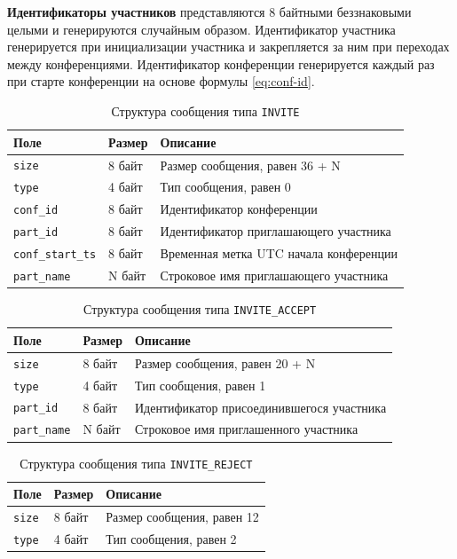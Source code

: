 \textbf{Идентификаторы участников} представляются 8 байтными беззнаковыми целыми и генерируются случайным образом.
Идентификатор участника генерируется при инициализации участника и закрепляется за ним при переходах между конференциями.
Идентификатор конференции генерируется каждый раз при старте конференции на основе формулы \ref{eq:conf-id}.

\begin{table}[H]
  \centering
  \caption{Структура сообщения типа \texttt{INVITE}}
  \label{tbl:msg:invite}
  \begin{tabular}{|l|l|l|}
    \hline
    \textbf{Поле} & \textbf{Размер} & \textbf{Описание} \\ \hline
    \texttt{size} & 8 байт & Размер сообщения, равен 36 + N \\ \hline
    \texttt{type} & 4 байт & Тип сообщения, равен 0 \\ \hline
    \texttt{conf\_id} & 8 байт & Идентификатор конференции \\ \hline
    \texttt{part\_id} & 8 байт & Идентификатор приглашающего участника \\ \hline
    \texttt{conf\_start\_ts} & 8 байт & Временная метка UTC начала конференции \\ \hline
    \texttt{part\_name} & N байт & Строковое имя приглашающего участника \\ \hline
  \end{tabular}
\end{table}

\begin{table}[H]
  \centering
  \caption{Структура сообщения типа \texttt{INVITE\_ACCEPT}}
  \label{tbl:msg:invite-accept}
  \begin{tabular}{|l|l|l|}
    \hline
    \textbf{Поле} & \textbf{Размер} & \textbf{Описание} \\ \hline
    \texttt{size} & 8 байт & Размер сообщения, равен 20 + N \\ \hline
    \texttt{type} & 4 байт & Тип сообщения, равен 1 \\ \hline
    \texttt{part\_id} & 8 байт & Идентификатор присоединившегося участника \\ \hline
    \texttt{part\_name} & N байт & Строковое имя приглашенного участника \\ \hline
  \end{tabular}
\end{table}

\begin{table}[H]
  \centering
  \caption{Структура сообщения типа \texttt{INVITE\_REJECT}}
  \label{tbl:msg:invite-reject}
  \begin{tabular}{|l|l|l|}
    \hline
    \textbf{Поле} & \textbf{Размер} & \textbf{Описание} \\ \hline
    \texttt{size} & 8 байт & Размер сообщения, равен 12 \\ \hline
    \texttt{type} & 4 байт & Тип сообщения, равен 2 \\ \hline
  \end{tabular}
\end{table}

